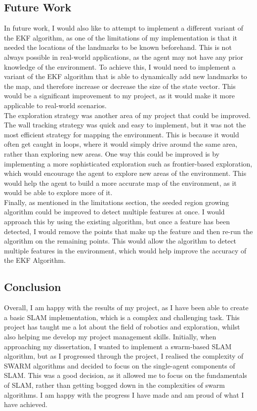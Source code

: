 \documentclass[12pt]{article}
\begin{document}
\subsection{Future Work}
In future work, I would also like to attempt to implement a different variant of the EKF algorithm, as one of the limitations of my implementation
is that it needed the locations of the landmarks to be known beforehand. This is not always possible in real-world applications, as the agent
may not have any prior knowledge of the environment. To achieve this, I would need to implement a variant of the EKF algorithm that is able
to dynamically add new landmarks to the map, and therefore increase or decrease the size of the state vector. This would be a significant
improvement to my project, as it would make it more applicable to real-world scenarios.\\

The exploration strategy was another area of my project that could be improved. The wall tracking strategy was quick and easy to implement,
but it was not the most efficient strategy for mapping the environment. This is because it would often get caught in loops, where it would simply
drive around the same area, rather than exploring new areas. One way this could be improved is by implementing a more sophisticated exploration
such as frontier-based exploration, which would encourage the agent to explore new areas of the environment. This would help the agent to build
a more accurate map of the environment, as it would be able to explore more of it.\\

Finally, as mentioned in the limitations section, the seeded region growing algorithm could be improved to detect multiple features at once.
I would approach this by using the existing algorithm, but once a feature has been detected, I would remove the points that make up the feature
and then re-run the algorithm on the remaining points. This would allow the algorithm to detect multiple features in the environment, which would
help improve the accuracy of the EKF Algorithm.\\

\subsection{Conclusion}
Overall, I am happy with the results of my project, as I have been able to create a basic SLAM implementation, which is a complex and challenging
task. This project has taught me a lot about the field of robotics and exploration, whilst also helping me develop my project management skills.
Initially, when approaching my dissertation, I wanted to implement a swarm-based SLAM algorithm, but as I progressed through the project, I realised
the complexity of SWARM algorithms and decided to focus on the single-agent components of SLAM. This was a good decision, as it allowed me to
focus on the fundamentals of SLAM, rather than getting bogged down in the complexities of swarm algorithms. I am happy with the progress I have
made and am proud of what I have achieved.\\
\end{document}
